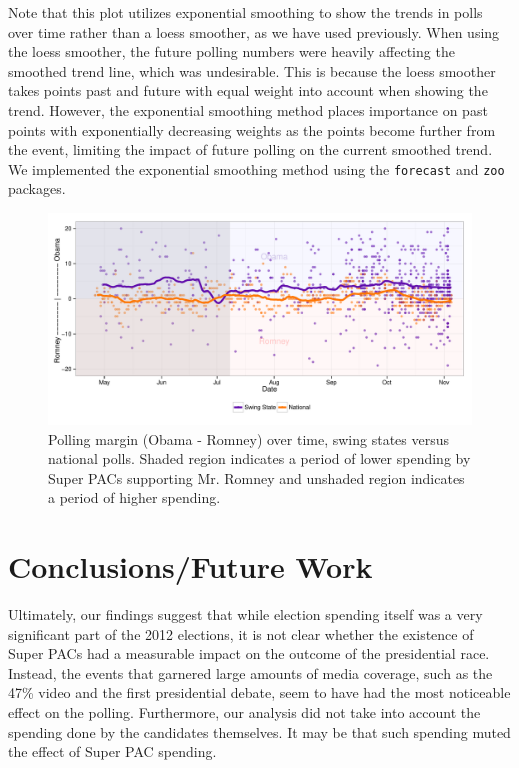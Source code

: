 \documentclass[11pt]{article}\usepackage{graphicx, color}
\newenvironment{knitrout}{}{} %
\begin{document}
Note that this plot utilizes exponential smoothing to show the trends in polls over time rather than a loess smoother, as we have used previously. When using the loess smoother, the future polling numbers were heavily affecting the smoothed trend line, which was undesirable. This is because the loess smoother takes points past and future with equal weight into account when showing the trend. However, the exponential smoothing method places importance on past points with exponentially decreasing weights as the points become further from the event, limiting the impact of future polling on the current smoothed trend. We implemented the exponential smoothing method using the \texttt{forecast} and \texttt{zoo} packages.

\begin{knitrout}
\color{fgcolor}\begin{figure}[H]


{\centering \includegraphics[width=\textwidth]{figure/effect_plot} 

}

\caption[Polling margin (Obama - Romney) over time, swing states versus national polls]{Polling margin (Obama - Romney) over time, swing states versus national polls. Shaded region indicates a period of lower spending by Super PACs supporting Mr. Romney and unshaded region indicates a period of higher spending.\label{fig:effect_plot}}
\end{figure}


\end{knitrout}


\section{Conclusions/Future Work}
Ultimately, our findings suggest that while election spending itself was a very significant part of the 2012 elections, it is not clear whether the existence of Super PACs had a measurable impact on the outcome of the presidential race. Instead, the events that garnered large amounts of media coverage, such as the 47\% video and the first presidential debate, seem to have had the most noticeable effect on the polling. Furthermore, our analysis did not take into account the spending done by the candidates themselves. It may be that such spending muted the effect of Super PAC spending.
\end{document}
